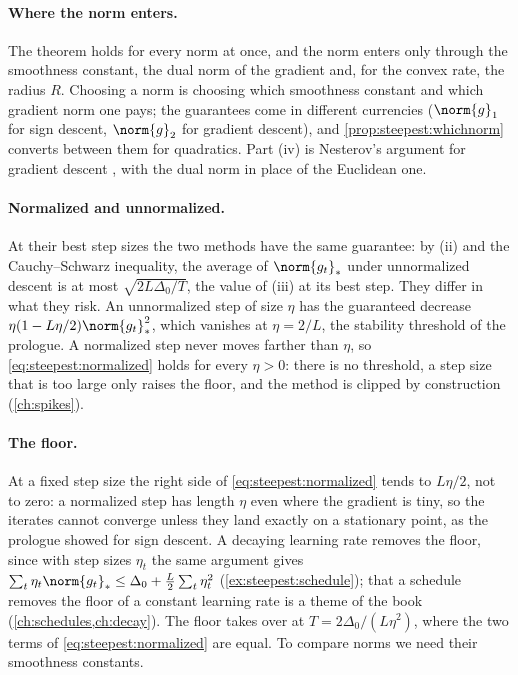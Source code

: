 \begin{refsection}
\paragraph{Where the norm enters.} The theorem holds for every norm at once, and the norm enters only through the smoothness constant, the dual norm of the gradient and, for the convex rate, the radius $R$. Choosing a norm is choosing which smoothness constant and which gradient norm one pays; the guarantees come in different currencies ($\norm{g}_1$ for sign descent, $\norm{g}_2$ for gradient descent), and \cref{prop:steepest:whichnorm} converts between them for quadratics. Part (iv) is Nesterov's argument for gradient descent \parencite{Nesterov2018}, with the dual norm in place of the Euclidean one.

\paragraph{Normalized and unnormalized.} At their best step sizes the two methods have the same guarantee: by (ii) and the Cauchy--Schwarz inequality, the average of $\norm{g_t}_*$ under unnormalized descent is at most $\sqrt{2L\Delta_0/T}$, the value of (iii) at its best step. They differ in what they risk. An unnormalized step of size $\eta$ has the guaranteed decrease $\eta(1-L\eta/2)\norm{g_t}_*^2$, which vanishes at $\eta=2/L$, the stability threshold of the prologue. A normalized step never moves farther than $\eta$, so \eqref{eq:steepest:normalized} holds for every $\eta>0$: there is no threshold, a step size that is too large only raises the floor, and the method is clipped by construction (\cref{ch:spikes}).

\paragraph{The floor.} At a fixed step size the right side of \eqref{eq:steepest:normalized} tends to $L\eta/2$, not to zero: a normalized step has length $\eta$ even where the gradient is tiny, so the iterates cannot converge unless they land exactly on a stationary point, as the prologue showed for sign descent. A decaying learning rate removes the floor, since with step sizes $\eta_t$ the same argument gives $\sum_t\eta_t\norm{g_t}_*\le\Delta_0+\frac L2\sum_t\eta_t^2$ (\cref{ex:steepest:schedule}); that a schedule removes the floor of a constant learning rate is a theme of the book (\cref{ch:schedules,ch:decay}). The floor takes over at $T=2\Delta_0/(L\eta^2)$, where the two terms of \eqref{eq:steepest:normalized} are equal. To compare norms we need their smoothness constants.


\end{refsection}
